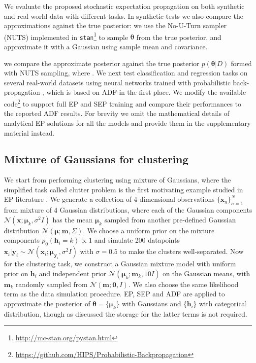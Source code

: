 We evaluate the proposed stochastic expectation propagation on both synthetic and real-world data with different tasks. In synthetic tests we also compare the approximations against the true posterior: we use the No-U-Turn sampler (NUTS) \cite{hoffman:nuts} implemented in \texttt{stan}\footnote{\url{http://mc-stan.org/pystan.html}} to sample $\bm{\theta}$ from the true posterior, and approximate it with a Gaussian using sample mean and covariance. 


we compare the approximate posterior against the true posterior $p(\bm{\theta}|D)$ formed with NUTS sampling, where . We next test classification and regression tasks on several real-world datasets using neural networks trained with probabilistic back-propagation \cite{miguel:pbp}, which is based on ADF in the first place. We modify the available code\footnote{\url{https://github.com/HIPS/Probabilistic-Backpropagation}} to support full EP and SEP training and compare their performances to the reported ADF results. For brevity we omit the mathematical details of analytical EP solutions for all the models and provide them in the supplementary material instead.

%
\subsection{Mixture of Gaussians for clustering}
We start from performing clustering using mixture of Gaussians, where the simplified task called clutter problem is the first motivating example studied in EP literature \cite{minka:ep}. We generate a collection of 4-dimensional observations $\{\bm{x}_n\}_{n=1}^N$ from mixture of 4 Gaussian distributions, where each of the Gaussian components $\mathcal{N}(\bm{x}; \bm{\mu}_k, \sigma^2 I)$ has the mean $\bm{\mu}_k$ sampled from another pre-defined Gaussian distribution $\mathcal{N}(\bm{\mu}; \bm{m}, \Sigma)$. We choose a uniform prior on the mixture components $p_0(\bm{h}_i = k) \propto 1$ and simulate 200 datapoints $\bm{x}_i | \bm{y}_i \sim \mathcal{N}(\bm{x}_i; \bm{\mu}_{\bm{y}_i}, \sigma^2 I)$ with $\sigma = 0.5$ to make the clusters well-separated. Now for the clustering task, we construct a Gaussian mixture model with uniform prior on $\bm{h}_i$ and independent prior $\mathcal{N}(\bm{\mu}_k; \bm{m}_k, 10I)$ on the Gaussian means, with $\bm{m}_k$ randomly sampled from $\mathcal{N}(\bm{m}; \bm{0}, I)$. We also choose the same likelihood term as the data simulation procedure. EP, SEP and ADF are applied to approximate the posterior of $\bm{\theta} = \{ \bm{\mu}_k \}$ with Gaussians and $\{\bm{h}_i\}$ with categorical distribution, though as discussed the storage for the latter terms is not required. 


